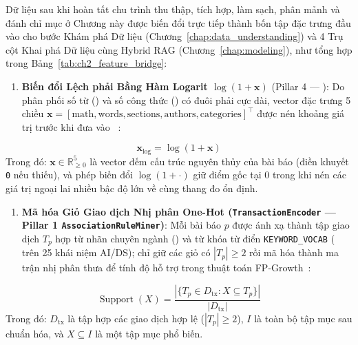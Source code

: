 Dữ liệu sau khi hoàn tất chu trình thu thập, tích hợp, làm sạch, phân mảnh và đánh chỉ mục ở Chương này được biến đổi trực tiếp thành bốn tập đặc trưng đầu vào cho bước Khám phá Dữ liệu (Chương~\ref{chap:data_understanding}) và 4 Trụ cột Khai phá Dữ liệu cùng Hybrid RAG (Chương~\ref{chap:modeling}), như tổng hợp trong Bảng~\ref{tab:ch2_feature_bridge}:
\begin{enumerate}[label=\textbf{\arabic*.}]
  \item \textbf{Biến đổi Lệch phải Bằng Hàm Logarit $\log(1+\mathbf{x})$} (Pillar 4 --- ): Do phân phối số từ () và số công thức () có đuôi phải cực dài, vector đặc trưng 5 chiều $\mathbf{x} = [\text{math}, \text{words}, \text{sections}, \text{authors}, \text{categories}]^\top$ được nén khoảng giá trị trước khi đưa vào ~\cite{liu2008isolation}:
\end{enumerate}
\begin{equation}
  \mathbf{x}_{\log} = \log(1 + \mathbf{x})
  \label{eq:ch2_log1p}
\end{equation}
\noindent Trong đó: $\mathbf{x} \in \mathbb{R}_{\ge 0}^{5}$ là vector đếm cấu trúc nguyên thủy của bài báo (điền khuyết \texttt{0} nếu thiếu), và phép biến đổi $\log(1 + \cdot)$ giữ điểm gốc tại $0$ trong khi nén các giá trị ngoại lai nhiều bậc độ lớn về cùng thang đo ổn định.

\begin{enumerate}[label=\textbf{\arabic*.}, start=2]
  \item \textbf{Mã hóa Giỏ Giao dịch Nhị phân One-Hot (\texttt{TransactionEncoder} --- Pillar 1 \texttt{AssociationRuleMiner})}: Mỗi bài báo $p$ được ánh xạ thành tập giao dịch $T_p$ hợp từ nhãn chuyên ngành () và từ khóa từ điển \texttt{KEYWORD\_VOCAB} ( trên 25 khái niệm AI/DS); chỉ giữ các giỏ có $|T_p| \ge 2$ rồi mã hóa thành ma trận nhị phân thưa để tính độ hỗ trợ trong thuật toán FP-Growth~\cite{han2000mining}:
\end{enumerate}
\begin{equation}
  \operatorname{Support}(X) = \frac{|\{T_p \in D_{\mathrm{tx}} : X \subseteq T_p\}|}{|D_{\mathrm{tx}}|}
  \label{eq:ch2_support}
\end{equation}
\noindent Trong đó: $D_{\mathrm{tx}}$ là tập hợp các giao dịch hợp lệ ($|T_p| \ge 2$), $I$ là toàn bộ tập mục sau chuẩn hóa, và $X \subseteq I$ là một tập mục phổ biến.

